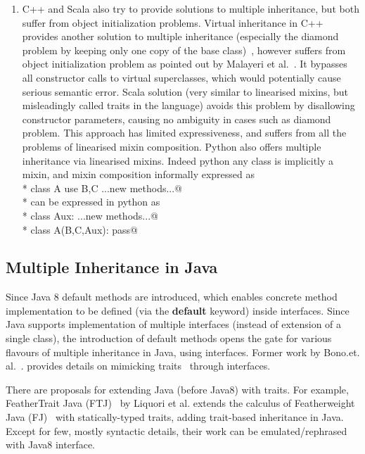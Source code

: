 \begin{enumerate}
\item C++ and Scala also try to provide solutions to multiple inheritance, but both
suffer from object initialization problems. Virtual inheritance in C++ provides
another solution to multiple inheritance (especially the diamond problem by
keeping only one copy of the base class)~\cite{ellis1990annotated}, however
suffers from object initialization problem as pointed out by Malayeri et
al.~\cite{malayeri2009cz}. It bypasses all constructor calls to virtual
superclasses, which would potentially cause serious semantic error. Scala
solution (very similar to linearised mixins, but misleadingly called traits in the language) avoids this problem by disallowing constructor parameters,
causing no ambiguity in cases such as diamond problem. 
This approach has limited expressiveness, and suffers from all the problems of linearised mixin composition.
Python also offers multiple inheritance via linearised mixins. Indeed python any class is implicitly a mixin, and mixin composition informally expressed as\\*
\Q@ class A use B,C {...new methods...}@\\*
can be expressed in python as \\*
\Q@ class Aux: ...new methods...@\\*
\Q@ class A(B,C,Aux):  pass@ 
\end{enumerate}

\subsection{Multiple Inheritance in Java}
Since Java 8 default methods are introduced, which enables concrete method
implementation to be defined (via the \textbf{default} keyword) inside
interfaces. Since Java supports implementation of multiple interfaces (instead of extension of a single
class), the introduction of default methods opens the gate for various flavours of multiple
inheritance in Java, using interfaces. 
Former work by Bono.et. al.~\cite{bono14}.
provides details on mimicking traits~\cite{sharly thesis} through interfaces.


There are proposals for extending Java (before Java8) with traits. For example, FeatherTrait
Java (FTJ)~\cite{Liquori08ftj} by Liquori et al. extends the calculus of
Featherweight Java (FJ)~\cite{Igarashi01FJ} with statically-typed traits, adding
trait-based inheritance in Java.
Except for few, mostly syntactic details, their work can be emulated/rephrased with Java8 interface.


